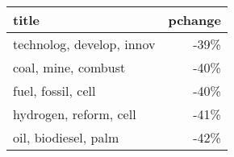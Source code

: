 \begin{tabular}{lr}
\toprule
                     title &  pchange \\
\midrule
 technolog, develop, innov &     -39\% \\
       coal, mine, combust &     -40\% \\
        fuel, fossil, cell &     -40\% \\
    hydrogen, reform, cell &     -41\% \\
      oil, biodiesel, palm &     -42\% \\
\bottomrule
\end{tabular}
